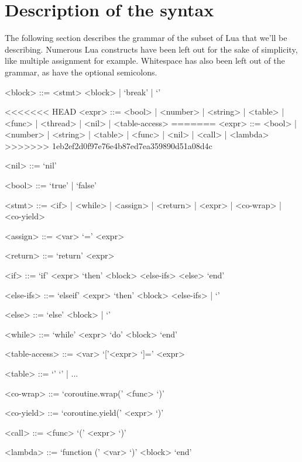 \documentclass{article}
\begin{document}
\section{Description of the syntax}

The following section describes the grammar of the subset of Lua that we'll be
describing. Numerous Lua constructs have been left out for the sake of
simplicity, like multiple assignment for example. Whitespace has also been left
out of the grammar, as have the optional semicolons. 

\newpage

\begin{grammar}
	<block> ::= <stmt> <block> | `break' | `'
	
<<<<<<< HEAD
	<expr> ::= <bool> | <number> | <string> | <table> | <func> | <thread> | <nil> | <table-access>
=======
	<expr> ::= <bool> | <number> | <string> | <table> | <func> | <nil> | <call>
		| <lambda>
>>>>>>> 1eb2ef2d0f97e76e4b87ed7ea359890d51a08d4c
	
	<nil> ::= `nil'
	
	<bool> ::= `true' | `false'
	
	<stmt> ::= <if> | <while> | <assign> | <return> | <expr> | <co-wrap>
		| <co-yield>
	
	<assign> ::= <var> `=' <expr>
	
	<return> ::= `return' <expr>
	
	<if> ::= `if' <expr> `then' <block> <else-ifs> <else> `end'
	
	<else-ifs> ::= `elseif' <expr> `then' <block> <else-ifs> | `'
	
	<else> ::= `else' <block> | `'
	
	<while> ::= `while' <expr> `do' <block> `end'
	
	<table-access> ::= <var> `['<expr> `]=' <expr>
	
	<table> ::= `{' `}' | ...

	<co-wrap> ::= `coroutine.wrap(' <func> `)'

	<co-yield> ::= `coroutine.yield(' <expr> `)'

	<call> ::= <func> `(' <expr> `)'

	<lambda> ::= `function (' <var> `)' <block> `end'
\end{grammar}
\end{document}
